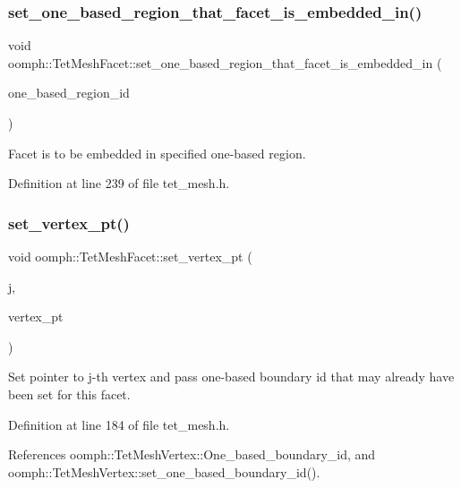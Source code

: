 \subsubsection{\texorpdfstring{set\+\_\+one\+\_\+based\+\_\+region\+\_\+that\+\_\+facet\+\_\+is\+\_\+embedded\+\_\+in()}{set\_one\_based\_region\_that\_facet\_is\_embedded\_in()}}
{\footnotesize\ttfamily void oomph\+::\+Tet\+Mesh\+Facet\+::set\+\_\+one\+\_\+based\+\_\+region\+\_\+that\+\_\+facet\+\_\+is\+\_\+embedded\+\_\+in (\begin{DoxyParamCaption}\item[{const unsigned \&}]{one\+\_\+based\+\_\+region\+\_\+id }\end{DoxyParamCaption})\hspace{0.3cm}{\ttfamily [inline]}}



Facet is to be embedded in specified one-\/based region. 



Definition at line 239 of file tet\+\_\+mesh.\+h.

\mbox{\label{classoomph_1_1TetMeshFacet_a08ca13e75ab395de75eab807d2f680b5}} 
\subsubsection{\texorpdfstring{set\+\_\+vertex\+\_\+pt()}{set\_vertex\_pt()}}
{\footnotesize\ttfamily void oomph\+::\+Tet\+Mesh\+Facet\+::set\+\_\+vertex\+\_\+pt (\begin{DoxyParamCaption}\item[{const unsigned \&}]{j,  }\item[{\hyperlink{classoomph_1_1TetMeshVertex}{Tet\+Mesh\+Vertex} $\ast$}]{vertex\+\_\+pt }\end{DoxyParamCaption})\hspace{0.3cm}{\ttfamily [inline]}}

Set pointer to j-\/th vertex and pass one-\/based boundary id that may already have been set for this facet. 

Definition at line 184 of file tet\+\_\+mesh.\+h.



References oomph\+::\+Tet\+Mesh\+Vertex\+::\+One\+\_\+based\+\_\+boundary\+\_\+id, and oomph\+::\+Tet\+Mesh\+Vertex\+::set\+\_\+one\+\_\+based\+\_\+boundary\+\_\+id().

